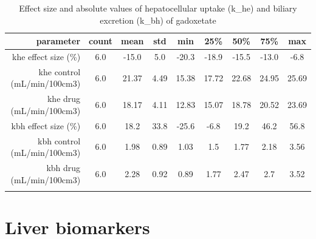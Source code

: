 \documentclass{epflreport}%
\begin{document}
%
\begin{longtable}{rcccccccc}%
\hline%
parameter&count&mean&std&min&25\%&50\%&75\%&max\\%
\hline%
khe effect size (\%)&6.0&{-}15.0&5.0&{-}20.3&{-}18.9&{-}15.5&{-}13.0&{-}6.8\\%
khe control (mL/min/100cm3)&6.0&21.37&4.49&15.38&17.72&22.68&24.95&25.69\\%
khe drug (mL/min/100cm3)&6.0&18.17&4.11&12.83&15.07&18.78&20.52&23.69\\%
kbh effect size (\%)&6.0&18.2&33.8&{-}25.6&{-}6.8&19.2&46.2&56.8\\%
kbh control (mL/min/100cm3)&6.0&1.98&0.89&1.03&1.5&1.77&2.18&3.56\\%
kbh drug (mL/min/100cm3)&6.0&2.28&0.92&0.89&1.77&2.47&2.7&3.52\\%
\hline%
\caption{Effect size and absolute values of hepatocellular uptake (k\_he) and biliary excretion (k\_bh) of gadoxetate} \\%
\end{longtable}%
\clearpage%
\section{Liver biomarkers}%
\label{sec:Liverbiomarkers}%
\end{document}
